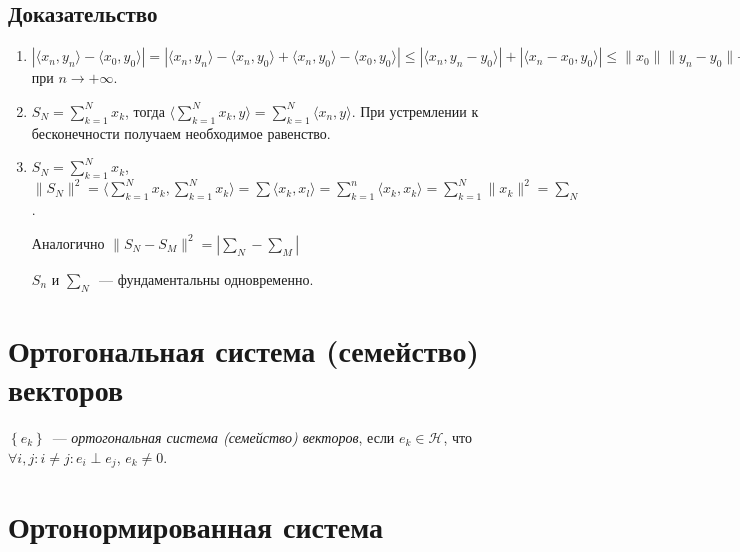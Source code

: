 \documentclass{article}
\begin{document}
        \subsection{Доказательство}
        
            \begin{enumerate}
            
                \item $| \langle x_n, y_n \rangle - \langle x_0, y_0 \rangle | = | \langle  x_n, y_n \rangle - \langle x_n, y_0 \rangle + \langle x_n, y_0 \rangle - \langle x_0, y_0 \rangle | \leqslant | \langle x_n, y_n - y_0 \rangle | + | \langle x_n - x_0, y_0 \rangle | \leqslant \| x_0 \| \| y_n - y_0 \| + \| x_n - x_0 \| \| y_0 \| \rightarrow 0$ при $n \rightarrow +\infty$.
                
                \item $S_N = \sum\limits^N_{k = 1} x_k$, тогда $\langle \sum\limits_{k = 1}^N x_k, y \rangle = \sum\limits_{k = 1}^N \langle x_n, y \rangle$. При устремлении к бесконечности получаем необходимое равенство.
                
                \item $S_N = \sum\limits_{k = 1}^N x_k$, $\| S_N \|^2 = \langle \sum\limits_{k = 1}^N x_k, \sum\limits_{k = 1}^N x_k \rangle = \sum \langle x_k, x_l \rangle = \sum\limits_{k = 1}^n \langle x_k, x_k \rangle = \sum\limits_{k = 1}^N \| x_k \|^2 = \sum_N$.
                
                Аналогично $\| S_N - S_M \|^2 = \left| \sum_N - \sum_M \right|$
                
                $S_n$ и $\sum_N$~--- фундаментальны одновременно.
                
            \end{enumerate}
    
    \newpage
        
    \section{Ортогональная система (семейство) векторов}
    
        $\left\{ e_k \right\}$~--- \textit{ортогональная система (семейство) векторов}, если $e_k \in \mathcal{H}$, что $\forall i, j : i \neq j : e_i \perp e_j$, $e_k \neq 0$. 
        
    \newpage
    
    \section{Ортонормированная система}
    
\end{document}
